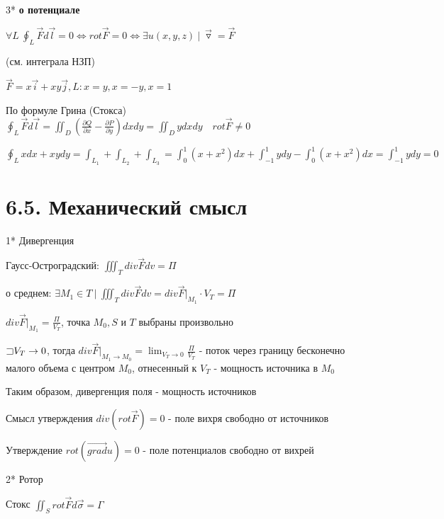 \documentclass[12pt]{article}
\begin{document}
    \mediumvspace

    3* \hypertarget{potentialvector}{\textbf{\Ths о потенциале}}

    $\forall L \ \oint_L \overrightarrow{F}d\overrightarrow{l} = 0 \Longleftrightarrow rot \overrightarrow{F} = 0 \Longleftrightarrow \exists u(x, y, z) \ | \ \overrightarrow{\triangledown} = \overrightarrow{F}$

    (см. \Ths интеграла НЗП)

    \Ex $\overrightarrow{F} = x\overrightarrow{i} + xy \overrightarrow{j}, L: x = y, x = -y, x = 1$

    По формуле Грина (Стокса) $\oint_L \overrightarrow{F} d\overrightarrow{l} = \iint_{D} \left(\frac{\partial Q}{\partial x} - \frac{\partial P}{\partial y}\right) dxdy =
    \iint_D y dxdy \quad rot \overrightarrow{F} \neq 0$

    $\oint_L xdx + xydy = \int_{L_1} + \int_{L_2} + \int_{L_3} = \int_0^1 (x + x^2) dx + \int_{-1}^1 y dy - \int_0^1 (x + x^2) dx = \int_{-1}^1 y dy = 0$

    \section{6.5. Механический смысл}

    1* Дивергенция

    Гаусс-Остроградский: $\iiint_T div \overrightarrow{F} dv = \Pi$

    \Ths о среднем: $\exists M_1 \in T \ | \ \iiint_T div \overrightarrow{F} dv = div \overrightarrow{F} \Big|_{M_1} \cdot V_T = \Pi$

    $div \overrightarrow{F} \Big|_{M_1} = \frac{\Pi}{V_T}$, точка $M_0, S$ и $T$ выбраны произвольно

    $\mathord{\sqsupset} V_T \to 0$, тогда $div \overrightarrow{F} \Big|_{M_1 \to M_0} = \lim_{V_T \to 0} \frac{\Pi}{V_T}$ - поток через границу бесконечно малого объема с центром $M_0$, отнесенный к $V_T$ - мощность источника в $M_0$

    Таким образом, дивергенция поля - мощность источников

    \Nota Смысл утверждения $div (rot \overrightarrow F) = 0$ - поле вихря свободно от источников

    \Nota Утверждение $rot (\overrightarrow{grad} u) = 0$ - поле потенциалов свободно от вихрей

    \mediumvspace

    2* Ротор

    Стокс $\iint_S rot \overrightarrow{F} d\overrightarrow{\sigma} = \Gamma$
\end{document}
